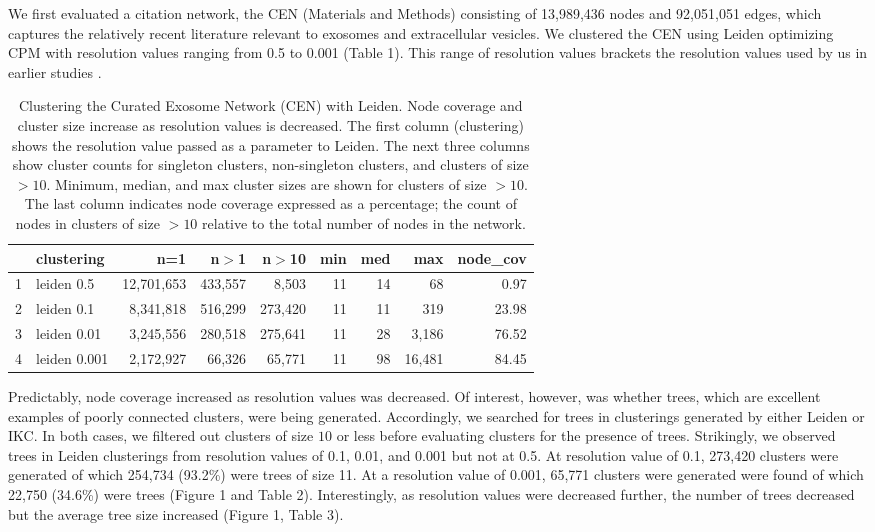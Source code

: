 \documentclass[a4paper]{article}   	%
\begin{document}
We first evaluated a citation network, the CEN (Materials and Methods) consisting of 13,989,436 nodes and 92,051,051 edges, which captures the relatively recent literature relevant to exosomes and extracellular vesicles. We clustered the CEN using Leiden optimizing CPM with resolution values ranging from 0.5 to 0.001 (Table 1). This range of resolution values brackets the resolution values used by us in earlier studies \citep{Wedell2022,Jakatdar_2022}.

\begin{table}[ht]
\centering
\begin{tabular}{rlrrrrrrr}
  \hline
 & clustering & n=1 & n$>$1 & n$>$10 & min & med & max & node\_cov \\
  \hline
1 & leiden 0.5 & 12,701,653 & 433,557 & 8,503 & 11 & 14 & 68 & 0.97 \\
  2 & leiden 0.1 & 8,341,818 & 516,299 & 273,420 & 11 & 11 & 319 & 23.98 \\
  3 & leiden 0.01 & 3,245,556 & 280,518 & 275,641 & 11 & 28 & 3,186 & 76.52 \\
  4 & leiden 0.001 & 2,172,927 & 66,326 & 65,771 & 11 & 98 & 16,481 & 84.45 \\
   \hline
\end{tabular}
\caption{Clustering the Curated Exosome Network (CEN) with Leiden. Node coverage and cluster size increase as resolution values is decreased. The first column (clustering) shows the resolution value passed as a parameter to Leiden. The next three columns show cluster counts for singleton clusters, non-singleton clusters, and clusters of size $>10$. Minimum, median, and max cluster sizes are shown for clusters of size $>10$. The last column indicates node coverage expressed as a percentage; the count of nodes in clusters of size $>10$ relative to the total number of nodes in the network. }
\label{tab: table1}
\end{table}

Predictably, node coverage increased as resolution values was decreased. Of interest, however, was whether trees, which are excellent examples of poorly connected clusters, were being generated. Accordingly, we searched for trees in clusterings generated by either Leiden or IKC. In both cases, we filtered out clusters of size $10$ or less before evaluating clusters for the presence of trees. Strikingly, we observed trees in Leiden clusterings from resolution values of 0.1, 0.01, and 0.001 but not at 0.5. At resolution value of 0.1, 273,420 clusters were generated of which 254,734 (93.2\%) were trees of size 11. At a resolution value of 0.001, 65,771 clusters were generated were found of which 22,750 (34.6\%) were trees (Figure 1 and Table 2). Interestingly, as resolution values were decreased further, the number of trees decreased but the average tree size increased (Figure 1, Table 3).
\end{document}
